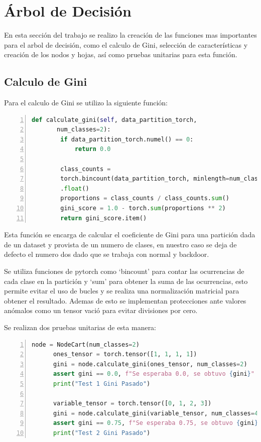 \documentclass[12pt,a4paper]{article}
\begin{document}
\section{Árbol de Decisión}\label{sec:arbol-de-decision}

En esta sección del trabajo se realizo la creación de las funciones mas importantes para el arbol de decisión, como el calculo de Gini,
selección de características y creación de los nodos y hojas, así como pruebas unitarias para esta función.

\subsection{Calculo de Gini}\label{subsec:calculo-de-gini}

Para el calculo de Gini se utilizo la siguiente función:

    \begin{lstlisting}[language=Python, numbers=left,label={lst:lstlisting}]
      def calculate_gini(self, data_partition_torch,
       num_classes=2):
        if data_partition_torch.numel() == 0:
            return 0.0

        class_counts =
        torch.bincount(data_partition_torch, minlength=num_classes)
        .float()
        proportions = class_counts / class_counts.sum()
        gini_score = 1.0 - torch.sum(proportions ** 2)
        return gini_score.item()
    \end{lstlisting}

Esta función se encarga de calcular el coeficiente de Gini para una partición dada de un dataset y provista de un
numero de clases, en nuestro caso se deja de defecto el numero dos dado que se trabaja con normal y backdoor.

Se utiliza funciones de pytorch como `bincount' para contar las ocurrencias de cada clase en la partición y `sum' para obtener la suma de las ocurrencias,
esto permite evitar el uso de bucles y se realiza una normalización matricial para obtener el resultado.
Ademas de esto
se implementan protecciones ante valores anómalos como un tensor vació para evitar divisiones por cero.

Se realizan dos pruebas unitarias de esta manera:

    \begin{lstlisting}[language=Python, numbers=left,label={lst:lstlisting2}]
      node = NodeCart(num_classes=2)
      ones_tensor = torch.tensor([1, 1, 1, 1])
      gini = node.calculate_gini(ones_tensor, num_classes=2)
      assert gini == 0.0, f"Se esperaba 0.0, se obtuvo {gini}"
      print("Test 1 Gini Pasado")

      variable_tensor = torch.tensor([0, 1, 2, 3])
      gini = node.calculate_gini(variable_tensor, num_classes=4)
      assert gini == 0.75, f"Se esperaba 0.75, se obtuvo {gini}"
      print("Test 2 Gini Pasado")
    \end{lstlisting}
\end{document}
